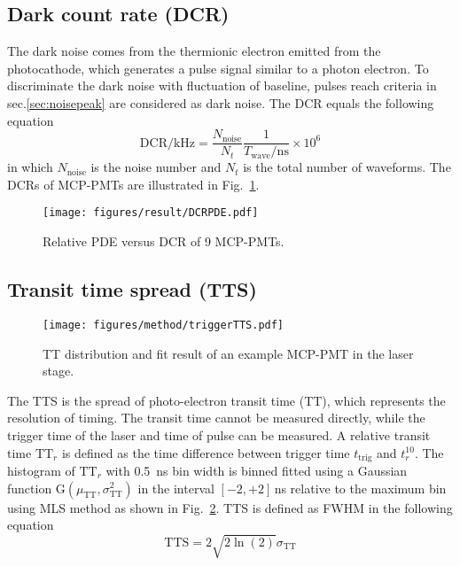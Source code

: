 \subsection{Dark count rate (DCR)}
The dark noise comes from the thermionic electron emitted from the photocathode, which generates a pulse signal similar to a photon electron. To discriminate the dark noise with fluctuation of baseline, pulses reach criteria in sec.\ref{sec:noisepeak} are considered as dark noise. The DCR equals the following equation
\begin{equation}
    \mathrm{DCR/kHz} = \frac{N_{\mathrm{noise}}}{N_{t}}\frac{1}{T_{\mathrm{wave}}/\mathrm{ns}}\times 10^{6}
\end{equation}
in which $N_{\mathrm{noise}}$ is the noise number and $N_{t}$ is the total number of waveforms. The DCRs of MCP-PMTs are illustrated in Fig.~\ref{fig:DCRCompare}.

\begin{figure}[!htbp]
    \centering
    \texttt{[image: figures/result/DCRPDE.pdf]}
    \caption{Relative PDE versus DCR of 9 MCP-PMTs.}
    \label{fig:DCRCompare}
\end{figure}

\subsection{Transit time spread (TTS)}
\begin{figure}[!htbp]
    \centering
    \texttt{[image: figures/method/triggerTTS.pdf]}
    \caption{TT distribution and fit result of an example MCP-PMT in the laser stage.}
    \label{fig:triggerTTS}
\end{figure}
The TTS is the spread of photo-electron transit time (TT), which represents the resolution of timing. The transit time cannot be measured directly, while the trigger time of the laser and time of pulse can be measured. A relative transit time $\mathrm{TT}_r$ is defined as the time difference between trigger time $t_{\mathrm{trig}}$ and $t_r^{10}$. The histogram of $\mathrm{TT}_r$ with \SI{0.5}{ns} bin width is binned fitted using a Gaussian function G$(\mu_{\mathrm{TT}},\sigma_{\mathrm{TT}}^2)$ in the interval $[-2,+2]$\,ns relative to the maximum bin using MLS method as shown in Fig.~\ref{fig:triggerTTS}.
TTS is defined as FWHM\cite{HAMAMATSUManual} in the following equation
\begin{equation}
    \mathrm{TTS}=2\sqrt{2\ln(2)}\sigma_{\mathrm{TT}}
\end{equation}
